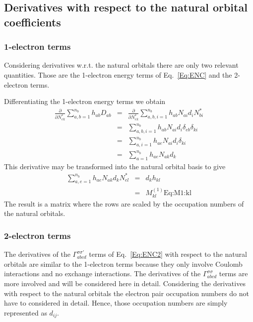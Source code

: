 \documentclass[pra,nofootinbib]{revtex4-1}
\newcommand{\dlabel}[1]{\text{#1}\label{#1}}
\begin{document}
\subsection{Derivatives with respect to the natural orbital coefficients}

\subsubsection{1-electron terms}

Considering derivatives w.r.t. the natural orbitals there are only two relevant
quantities. Those are the 1-electron energy terms of Eq.~\ref{Eq:ENC} and the
2-electron terms.

Differentiating the 1-electron energy terms we obtain
\begin{eqnarray}
  \frac{\partial}{\partial N^{*}_{ek}}\sum_{a,b=1}^{n_b}h_{ab}D_{ab}
  &=& \frac{\partial}{\partial N^{*}_{ek}}
      \sum_{a,b,i=1}^{n_b}h_{ab}N_{ai}d_iN^*_{bi} \\
  &=& \sum_{a,b,i=1}^{n_b}h_{ab}N_{ai}d_i\delta_{eb}\delta_{ki} \\
  &=& \sum_{a,i=1}^{n_b}h_{ae}N_{ai}d_i\delta_{ki} \\
  &=& \sum_{a=1}^{n_b}h_{ae}N_{ak}d_k
\end{eqnarray}
This derivative may be transformed into the natural orbital basis to give
\begin{eqnarray}
  \sum_{a,e=1}^{n_b}h_{ae}N_{ak}d_k N^*_{el}
  &=& d_k h_{kl} \\
  &=& M^{(1)}_{kl}
      \dlabel{Eq:M1:kl}
\end{eqnarray}
The result is a matrix where the rows are scaled by the occupation numbers
of the natural orbitals.

\subsubsection{2-electron terms}

The derivatives of the $\Gamma^{\sigma\sigma'}_{abcd}$ terms of
Eq.~\ref{Eq:ENC2} with respect to the natural orbitals are similar to the
1-electron terms because they only involve Coulomb interactions and no exchange
interactions. The derivatives of the $\Gamma^{\sigma\sigma}_{abcd}$ terms
are more involved and will be considered here in detail. Considering the
derivatives with respect to the natural orbitals the electron pair occupation
numbers do not have to considered in detail. Hence, those occupation numbers 
are simply represented as $d_{ij}$.
\end{document}
